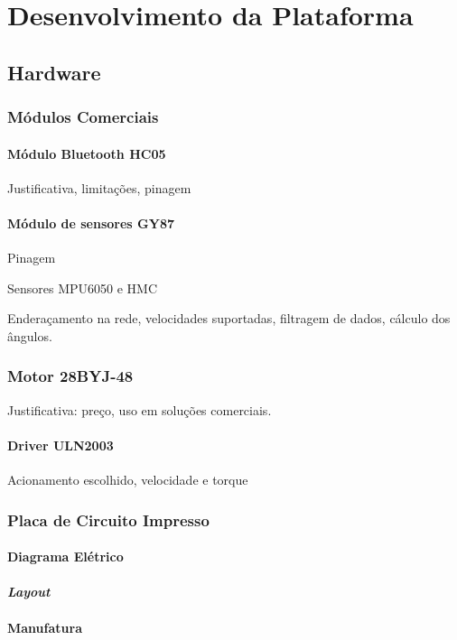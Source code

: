 \chapter{Desenvolvimento da Plataforma}

\section{Hardware}

\subsection{Módulos Comerciais}
\subsubsection{Módulo Bluetooth HC05}
Justificativa, limitações, pinagem

\subsubsection{Módulo de sensores GY87}
Pinagem

Sensores MPU6050 e HMC

Enderaçamento na rede, velocidades suportadas, filtragem de dados, cálculo dos ângulos.

\subsection{Motor 28BYJ-48}
Justificativa: preço, uso em soluções comerciais.

\subsubsection{Driver ULN2003}
Acionamento escolhido, velocidade e torque

\subsection{Placa de Circuito Impresso}

\subsubsection{Diagrama Elétrico}
\subsubsection{\textit{Layout}}

\subsubsection{Manufatura}

